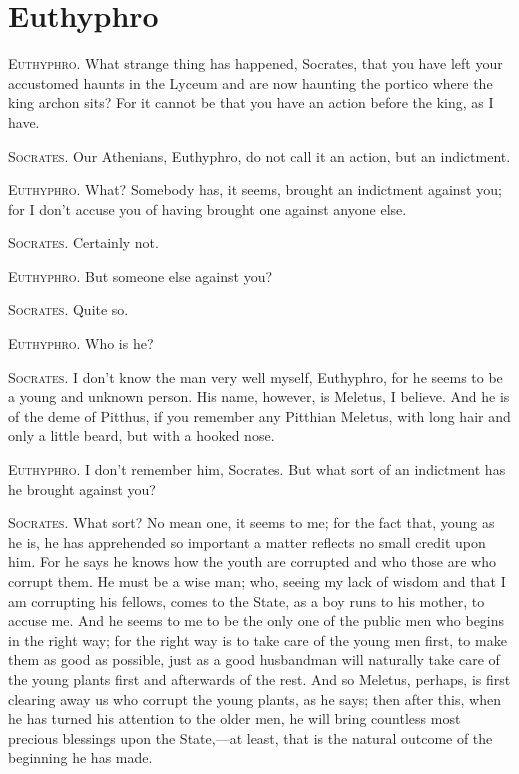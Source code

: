 
\author{Plato}
\chapter{Euthyphro}

\textsc{Euthyphro}. What strange thing has happened, Socrates,
that you have left your accustomed haunts in the Lyceum and are now
haunting the portico where the king archon sits? For it cannot be that
you have an action before the king, as I have.

\textsc{Socrates}. Our Athenians, Euthyphro, do not call it an action,
but an indictment.

\textsc{Euthyphro}. What? Somebody has, it seems, brought an
indictment against you; for I don't accuse you of having brought one
against anyone else.

\textsc{Socrates}. Certainly not.

\textsc{Euthyphro}. But someone else against you?

\textsc{Socrates}. Quite so.

\textsc{Euthyphro}. Who is he?

\textsc{Socrates}. I don't know the man very well myself, Euthyphro,
for he seems to be a young and unknown person. His name, however, is
Meletus, I believe. And he is of the deme of Pitthus, if you remember
any Pitthian Meletus, with long hair and only a little beard, but with
a hooked nose.

\textsc{Euthyphro}. I don't remember him, Socrates. But what
sort of an indictment has he brought against you?

\textsc{Socrates}. What sort? No mean one, it seems to me; for the
fact that, young as he is, he has apprehended so important a matter
reflects no small credit upon him. For he says he knows how the youth
are corrupted and who those are who corrupt them. He must be a wise
man; who, seeing my lack of wisdom and that I am corrupting his
fellows, comes to the State, as a boy runs to his mother, to accuse
me. And he seems to me to be the only one of the public men who begins
in the right way; for the right way is to take care of the young men
first, to make them as good as possible, just as a good husbandman
will naturally take care of the young plants first and afterwards of
the rest. And so Meletus, perhaps, is first clearing away us who
corrupt the young plants, as he says; then after this, when he has
turned his attention to the older men, he will bring countless most
precious blessings upon the State,---at least, that is the natural
outcome of the beginning he has made.

